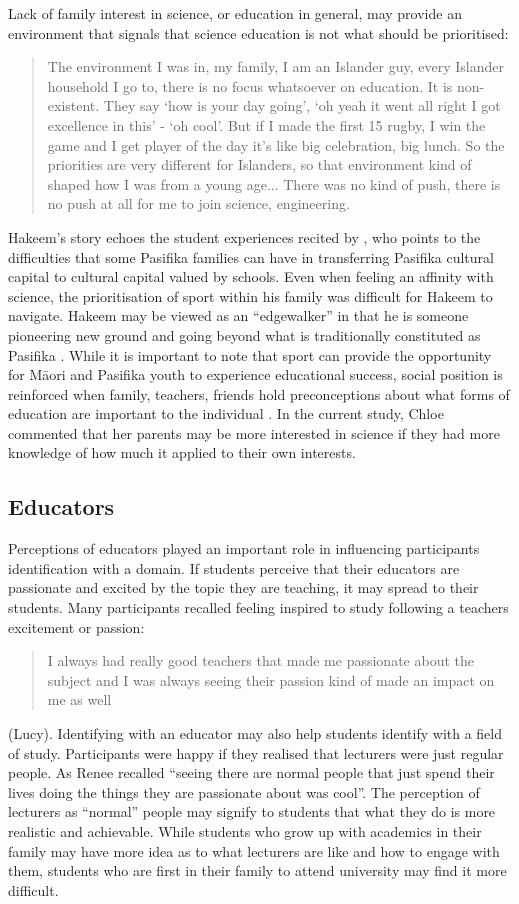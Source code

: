 Lack of family interest in science, or education in general, may provide an environment that signals that science education is not what should be prioritised: \blockquote{The environment I was in, my family, I am an Islander guy, every Islander household I go to, there is no focus whatsoever on education. It is non-existent. They say `how is your day going', `oh yeah it went all right I got excellence in this' - `oh cool'. But if I made the first 15 rugby, I win the game and I get player of the day it's like big celebration, big lunch. So the priorities are very different for Islanders, so that environment kind of shaped how I was from a young age... There was no kind of push, there is no push at all for me to join science, engineering.} Hakeem's story echoes the student experiences recited by \cite{mila2011polycultural}, who points to the difficulties that some Pasifika families can have in transferring Pasifika cultural capital to cultural capital valued by schools. Even when feeling an affinity with science, the prioritisation of sport within his family was difficult for Hakeem to navigate. Hakeem may be viewed as an ``edgewalker'' \citep{krebs1999edgewalkers,tupuola2004pasifika} in that he is someone pioneering new ground and going beyond what is traditionally constituted as Pasifika \cite[p.8]{mila2011polycultural}.  While it is important to note that sport can provide the opportunity for M\={a}ori and Pasifika youth to experience educational success, social position is reinforced when family, teachers, friends hold preconceptions about what forms of education are important to the individual \citep{fitzpatrick2013brown}. In the current study, Chloe commented that her parents may be more interested in science if they had more knowledge of how much it applied to their own interests. 


\subsection{Educators}
Perceptions of educators played an important role in influencing participants identification with a domain. If students perceive that their educators are passionate and excited by the topic they are teaching, it may spread to their students. Many participants recalled feeling inspired to study following a teachers excitement or passion: \blockquote{I always had really good teachers that made me passionate about the subject and I was always seeing their passion kind of made an impact on me as well} (Lucy). Identifying with an educator may also help students identify with a field of study.  Participants were happy if they realised that lecturers were just regular people. As Renee recalled ``seeing there are normal people that just spend their lives doing the things they are passionate about was cool''. The perception of lecturers as ``normal'' people may signify to students that what they do is more realistic and achievable. While students who grow up with academics in their family may have more idea as to what lecturers are like and how to engage with them, students who are first in their family to attend university may find it more difficult.

